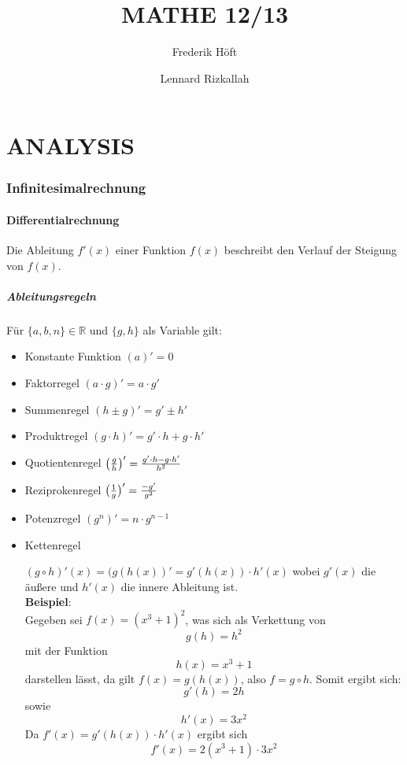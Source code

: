 \documentclass[a4paper,12pt]{article}
\begin{document}
\author{
	Frederik Höft\\
	\and
	Lennard Rizkallah\\
}
\title{MATHE 12/13}
\maketitle
\pagebreak
\tableofcontents{}
\pagebreak
\part{ANALYSIS}
\section{Infinitesimalrechnung}
\subsection{Differentialrechnung}
Die Ableitung $f'(x)$ einer Funktion $f(x)$ beschreibt den Verlauf der Steigung von $f(x)$.
\subsubsection{Ableitungsregeln}
Für $\{a,b,n\} \in \mathbb{R}$ und $\{g,h\}$ als Variable gilt:
\begin{itemize}
\item Konstante Funktion
	\subitem $(a)' = 0$
\item Faktorregel
	\subitem $(a \cdot g)' = a \cdot g'$
\item Summenregel
	\subitem $(h \pm g)' = g' \pm h'$
\item Produktregel
	\subitem $(g \cdot h)' = g' \cdot h + g \cdot h'$
\item Quotientenregel
	\subitem $\big{(}\frac{g}{h}\big{)}' = \frac{g' \cdot h - g \cdot h'}{h^2}$
\item Reziprokenregel
	\subitem $\big{(}\frac{1}{g}\big{)}' = \frac{-g'}{g^2}$
\item Potenzregel
	\subitem $(g^n)' = n \cdot g^{n-1}$
\item Kettenregel
	\subitem \parbox[t]{\linewidth}{$(g \circ h)'(x) = (g(h(x))' = g'(h(x)) \cdot h'(x)$
		wobei $g'(x)$ die äußere und $h'(x)$ die innere Ableitung ist.\\
		\textbf{Beispiel}:\\
		Gegeben sei $f(x) = (x^3 + 1)^2$, was sich als Verkettung von
		$$g(h) = h^2$$
		mit der Funktion
		$$h(x) = x^3 + 1$$
		darstellen lässt, da gilt $f(x) = g(h(x))$, also $f = g \circ h$. Somit ergibt sich:
		$$g'(h) = 2h$$
		sowie
		$$h'(x) = 3x^2$$
		Da $f'(x) = g'(h(x)) \cdot h'(x)$ ergibt sich
		$$f'(x) = 2(x^3 + 1) \cdot 3x^2$$}
\end{itemize}
\pagebreak
\end{document}
